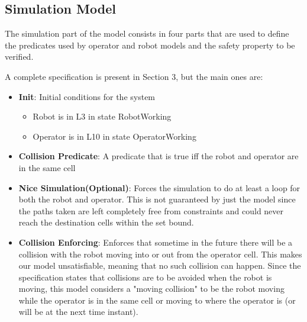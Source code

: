 
\subsection{Simulation Model}
The simulation part of the model consists in four parts that are used to define the predicates used by operator and robot models and the safety property to be verified.

A complete specification is present in Section 3, but the main ones are:
\begin{itemize}
	\item \textbf{Init}: Initial conditions for the system
	\begin{itemize}
		\item Robot is in L3 in state RobotWorking
		\item Operator is in L10 in state OperatorWorking
	\end{itemize}
	
	\item \textbf{Collision Predicate}: A predicate that is true iff the robot and operator are in the same cell
	
	\item \textbf{Nice Simulation(Optional)}: Forces the simulation to do at least a loop for both the robot and operator. This is not guaranteed by just the model since the paths taken are left completely free from constraints and could never reach the destination cells within the set bound.
	
	
	\item \textbf{Collision Enforcing}: Enforces that sometime in the future there will be a collision with the robot moving into or out from the operator cell. This makes our model unsatisfiable, meaning that no such collision can happen.
	Since the specification states that collisions are to be avoided when the robot is moving, this model considers a "moving collision" to be the robot moving while the operator is in the same cell or moving to where the operator is (or will be at the next time instant).
\end{itemize}


